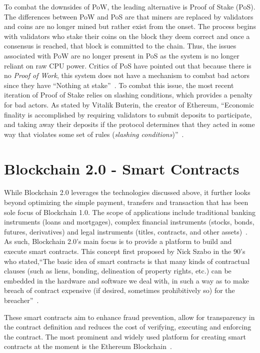 To combat the downsides of PoW, the leading alternative is Proof of Stake (PoS). The differences between PoW and PoS are that miners are replaced by validators and coins are no longer mined but rather exist from the onset. The process begins with validators who stake their coins on the block they deem correct and once a consensus is reached, that block is committed to the chain. Thus, the issues associated with PoW are no longer present in PoS as the system is no longer reliant on raw CPU power.  Critics of PoS have pointed out that because there is no \emph{Proof of Work}, this system does not have a mechanism to combat bad actors since they have ``Nothing at stake''~\cite{hid-sp18-414-www-pow-vs-pos}. To combat this issue, the most recent iteration of Proof of Stake relies on slashing conditions, which provides a penalty for bad actors. As stated by Vitalik Buterin, the creator of Ethereum, ``Economic finality is accomplished by requiring validators to submit deposits to participate, and taking away their deposits if the protocol determines that they acted in some way that violates some set of rules (\emph{slashing conditions})''~\cite{hid-sp18-414-www-pow-vs-pos}.



\section{Blockchain 2.0 - Smart Contracts}

While Blockchain 2.0 leverages the technologies discussed above, it further looks beyond optimizing the simple payment, transfers and transaction that has been sole focus of Blockchain 1.0.  The scope of applications include traditional banking instruments (loans and mortgages), complex financial instruments (stocks, bonds, futures, derivatives) and legal instruments (titles, contracts, and other assets)~\cite{hid-sp18-414-www-promise-bitcoin-blockchain}. As such, Blockchain 2.0's main focus is to provide a platform to build and execute smart contracts. This concept first proposed by Nick Szabo in the 90's who stated,``The basic idea of smart contracts is that many kinds of contractual clauses (such as liens, bonding, delineation of property rights, etc.) can be embedded in the hardware and software we deal with, in such a way as to make breach of contract expensive (if desired, sometimes prohibitively so) for the breacher''~\cite{hid-sp18-414-www-blockchain-theory-application}.

These smart contracts aim to enhance fraud prevention, allow for transparency in the contract definition and reduces the cost of verifying, executing and enforcing the contract. The most prominent and widely used platform for creating smart contracts at the moment is the Ethereum Blockchain~\cite{hid-sp18-414-www-blockchain-evolution}.

